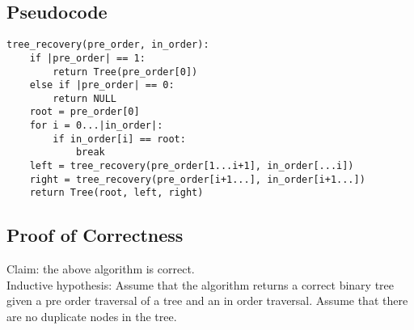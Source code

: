 \documentclass[12pt,letterpaper]{article}
\begin{document}
\subsection{Pseudocode}
\begin{verbatim}
tree_recovery(pre_order, in_order):
    if |pre_order| == 1:
        return Tree(pre_order[0])
    else if |pre_order| == 0:
        return NULL
    root = pre_order[0]
    for i = 0...|in_order|:
        if in_order[i] == root:
            break
    left = tree_recovery(pre_order[1...i+1], in_order[...i])
    right = tree_recovery(pre_order[i+1...], in_order[i+1...])
    return Tree(root, left, right)
\end{verbatim}

\subsection{Proof of Correctness}
Claim: the above algorithm is correct.\\
Inductive hypothesis: Assume that the algorithm returns a correct binary tree
given a pre order traversal of a tree and an in order traversal. Assume that
there are no duplicate nodes in the tree.
\end{document}
